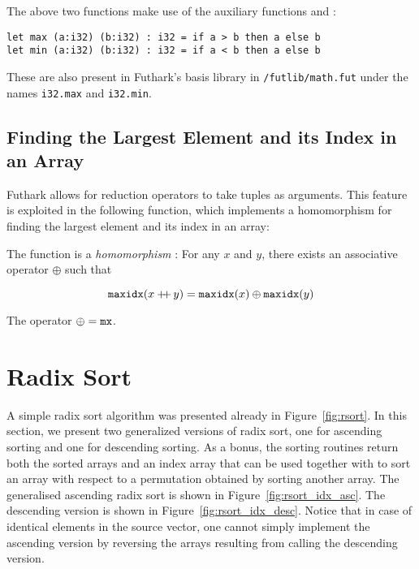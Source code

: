\documentclass[oneside,11pt]{book}
\newenvironment{wrap}{\vspace{\topskip}\par\noindent\begin{minipage}{\linewidth}}{\end{minipage}\par}
\newcommand{\pp}{+\!\!\!+}
\begin{document}
\begin{wrap}

\end{wrap}

The above two functions make use of the auxiliary functions  and
:

\begin{lstlisting}
let max (a:i32) (b:i32) : i32 = if a > b then a else b
let min (a:i32) (b:i32) : i32 = if a < b then a else b
\end{lstlisting}

These are also present in Futhark's basis library in
\texttt{/futlib/math.fut} under the names \lstinline{i32.max} and
\lstinline{i32.min}.

\subsection{Finding the Largest Element and its Index in an Array}

Futhark allows for reduction operators to take tuples as
arguments. This feature is exploited in the following function, which
implements a homomorphism for finding the largest element and its
index in an array:



\noindent The function  is a \emph{homomorphism} \cite{BirdListTh}: For any
$x$ and $y$, there exists an associative operator $\oplus$ such that

$$\kw{maxidx}(x \pp\, y) = \kw{maxidx}(x) \oplus \kw{maxidx}(y)$$

\noindent
The operator $\oplus = \texttt{mx}$.

\section{Radix Sort}
A simple radix sort algorithm was presented already in
Figure~\ref{fig:rsort}. In this section, we present two generalized
versions of radix sort, one for ascending sorting and one for
descending sorting. As a bonus, the sorting routines return both the
sorted arrays and an index array that can be used together with
 to sort an array with respect to a permutation obtained by
sorting another array. The generalised ascending radix sort is shown
in Figure~\ref{fig:rsort_idx_asc}. The descending version is shown in
Figure~\ref{fig:rsort_idx_desc}. Notice that in case of identical
elements in the source vector, one cannot simply implement the
ascending version by reversing the arrays resulting from calling the
descending version.
\end{document}
